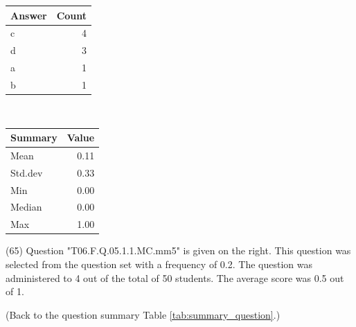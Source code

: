 \documentclass[12pt,english,nohyper]{tufte-handout}\usepackage[]{graphicx}\usepackage[]{color}
\begin{document}
\begin{center}%
\begin{tabular}{lr}
  \hline
Answer & Count \\ 
  \hline
c &   4 \\ 
  d &   3 \\ 
  a &   1 \\ 
  b &   1 \\ 
   \hline
\end{tabular}
~~~~~~~~%
\begin{tabular}{lr}
  \hline
Summary & Value \\ 
  \hline
Mean & 0.11 \\ 
  Std.dev & 0.33 \\ 
  Min & 0.00 \\ 
  Median & 0.00 \\ 
  Max & 1.00 \\ 
   \hline
\end{tabular}
\end{center}\newpage{} (65) Question "T06.F.Q.05.1.1.MC.mm5" is given on the right. This question was selected from the question set with a frequency of 0.2. The question was administered to 4 out of the total of 50 students. The average score was 0.5 out of 1.

 (Back to the question summary Table \ref{tab:summary_question}.)
\end{document}
